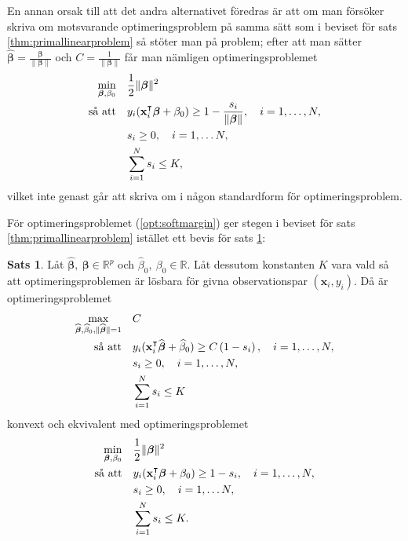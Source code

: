 \documentclass[a4paper, 12pt]{report}
\theoremstyle{definition}
\newtheorem{thm}{Sats}[section]
\theoremstyle{remark}
\newcommand{\bfbeta}{{\boldsymbol{\beta}}}
\begin{document}
En annan orsak till att det andra alternativet föredras är att om man försöker skriva om motsvarande optimeringsproblem på samma sätt som i beviset för sats \ref{thm:primallinearproblem} så stöter man på problem; efter att man sätter $\widehat{\bfbeta}=\frac{\bfbeta}{\|\bfbeta\|}$ och $C=\frac{1}{\|\bfbeta\|}$ får man nämligen optimeringsproblemet
\begin{equation*}
\begin{aligned}
\operatornamewithlimits{min}_{\bfbeta,\beta_0} & & &\frac{1}{2}\|\bfbeta\|^2\\
\text{så att} & & &y_i(\mathbf{x}_i^\intercal\bfbeta+\beta_0)\geq 1 - \frac{s_i}{\|\bfbeta\|},\quad i=1,\dots,N,\\
& & &s_i\geq0,\quad i=1,\dots N,\\
& & &\sum_{i=1}^{N} s_i \leq K,
\end{aligned}
\end{equation*}
vilket inte genast går att skriva om i någon standardform för optimeringsproblem.

För optimeringsproblemet (\ref{opt:softmargin}) ger stegen i beviset för sats \ref{thm:primallinearproblem} istället ett bevis för sats \ref{thm:primalsoftmargin}:
\begin{thm}\label{thm:primalsoftmargin}
	Låt $\widehat{\bfbeta},~\bfbeta \in \mathbb{R}^p$ och $\widehat{\beta}_0,~\beta_0 \in \mathbb{R}$. Låt dessutom konstanten $K$ vara vald så att optimeringsproblemen är lösbara för givna observationspar $\left(\mathbf{x}_i,y_i\right)$. Då är optimeringsproblemet
	\begin{equation*}
	\begin{aligned}
	\operatornamewithlimits{max}_{\widehat{\bfbeta},\widehat{\beta}_0,\|\widehat{\bfbeta}\|=1} & & &C\\
	\text{så att} & & &y_i(\mathbf{x}_i^\intercal\widehat{\bfbeta}+\widehat{\beta}_0)\geq C\left(1-s_i\right),\quad i=1,\dots,N,\\
	& & &s_i\geq0,\quad i=1,\dots,N,\\
	& & &\sum_{i=1}^{N}s_i \leq K
	\end{aligned}
	\end{equation*}
	konvext och ekvivalent med optimeringsproblemet %
	\begin{equation*}
	\begin{aligned}
	\operatornamewithlimits{min}_{\bfbeta,\beta_0} & & &\frac{1}{2}\|\bfbeta\|^2\\
	\text{så att} & & &y_i(\mathbf{x}_i^\intercal\bfbeta+\beta_0)\geq 1 - s_i,\quad i=1,\dots,N,\\
	& & &s_i\geq0,\quad i=1,\dots N,\\
	& & &\sum_{i=1}^{N} s_i \leq K.
	\end{aligned}
	\end{equation*}
\end{thm}
\end{document}
